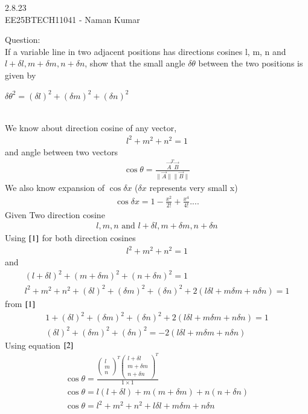 \documentclass[journal]{IEEEtran}
\author{EE25BTECH11041-Naman Kumar }
\begin{document}
\begin{center}
    \huge{2.8.23}\\
    \large{EE25BTECH11041 - Naman Kumar}
\end{center}
Question:\\
If a variable line in two adjacent positions has directions cosines l, m, n and $l+\delta l, m+\delta m, n +\delta n$, show that the small angle $\delta\theta$ between the two positions is given by
\begin{center}
    $\delta\theta^2=(\delta l)^2+(\delta m)^2+(\delta n)^2$
\end{center}
\solution \\
We know about direction cosine of any vector,
\begin{align}
    l^2+m^2+n^2=1 \label{1}
\end{align}
and angle between two vectors
\begin{align}
    \cos{\theta}=\frac{\Vec{A}^T\Vec{B}}{\lVert\Vec{A}\rVert\lVert\Vec{B}\rVert} \label{2}
\end{align}
We also know expansion of $\cos{\delta x}$ ($\delta x$ represents very small x)
\begin{align}
    \cos{\delta x}= 1-\frac{x^2}{2!}+\frac{x^4}{4!}.... \label{3}
\end{align}
Given Two direction cosine
\begin{align}
    l,m,n \text{ and } l+\delta l,m+\delta m,n+\delta n
\end{align}
Using $\eqref{1}$ for both direction cosines
\begin{align}
    l^2+m^2+n^2=1
\end{align}
and
\begin{align}
    (l+\delta l)^2+(m+\delta m)^2+(n+\delta n)^2=1\\
    l^2+m^2+n^2+(\delta l)^2+(\delta m)^2+(\delta n)^2+2(l\delta l+m\delta m+n\delta n)=1
\end{align}
from $\eqref{1}$
\begin{align}
    1+(\delta l)^2+(\delta m)^2+(\delta n)^2+2(l\delta l+m\delta m+n\delta n)=1\\
    (\delta l)^2+(\delta m)^2+(\delta n)^2=-2(l\delta l+m\delta m+n\delta n) \label{9}
\end{align}
Using equation $\eqref{2}$
\begin{align}
    \cos{\theta}=\frac{\begin{pmatrix}l\\m\\n\end{pmatrix}^T \begin{pmatrix}l+\delta l\\m+\delta m\\n+\delta n\end{pmatrix}^T}{1\times 1}\\
    \cos{\theta}=l(l+\delta l)+m(m+\delta m)+n(n+\delta n)\\
    \cos{\theta}=l^2+m^2+n^2+l\delta l+m\delta m+n\delta n\\
\end{align}
\end{document}
